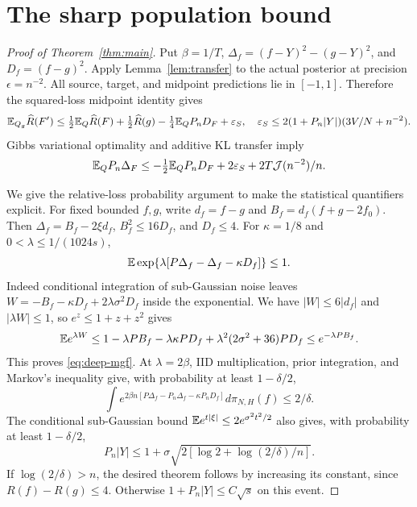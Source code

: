 \section{The sharp population bound}
\begin{proof}[Proof of Theorem~\ref{thm:main}]
Put $\beta=1/T$, $\Delta_f=(f-Y)^2-(g-Y)^2$, and
$D_f=(f-g)^2$. Apply Lemma~\ref{lem:transfer} to the actual posterior at precision $\epsilon=n^{-2}$. All source, target, and midpoint predictions lie in $[-1,1]$. Therefore the squared-loss midpoint identity gives
\[
 \mathbb E_{Q_g}\widehat R(F')\le\tfrac12\mathbb E_Q\widehat R(F)
 +\tfrac12\widehat R(g)-\tfrac14\mathbb E_Q P_nD_F+\varepsilon_S,
 \quad
 \varepsilon_S\le2(1+P_n|Y|)(3V/N+n^{-2}).
\]
Gibbs variational optimality and additive KL transfer imply
\begin{equation}
 \mathbb E_QP_n\Delta_F\le-\tfrac12\mathbb E_QP_nD_F
        +2\varepsilon_S+2T\mathcal J(n^{-2})/n.
 \label{eq:deep-offset}
\end{equation}

We give the relative-loss probability argument to make the statistical quantifiers explicit. For fixed bounded $f,g$, write $d_f=f-g$ and
$B_f=d_f(f+g-2f_0)$. Then $\Delta_f=B_f-2\xi d_f$,
$B_f^2\le16D_f$, and $D_f\le4$. For $\kappa=1/8$ and $0<\lambda\le1/(1024s)$,
\begin{equation}
 \mathbb E\exp\{\lambda[P\Delta_f-\Delta_f-\kappa D_f]\}\le1.
 \label{eq:deep-mgf}
\end{equation}
Indeed conditional integration of sub-Gaussian noise leaves
$W=-B_f-\kappa D_f+2\lambda\sigma^2D_f$ inside the exponential. We have $|W|\le6|d_f|$ and $|\lambda W|\le1$, so $e^z\le1+z+z^2$ gives
\[
 \mathbb E e^{\lambda W}\le1-\lambda PB_f-\lambda\kappa PD_f
          +\lambda^2(2\sigma^2+36)PD_f\le e^{-\lambda PB_f}.
\]
This proves \eqref{eq:deep-mgf}. At $\lambda=2\beta$, IID multiplication, prior integration, and Markov's inequality give, with probability at least $1-\delta/2$,
\[
 \int e^{2\beta n[P\Delta_f-P_n\Delta_f-\kappa P_nD_f]}
                d\pi_{N,H}(f)\le2/\delta.
\]
The conditional sub-Gaussian bound $\mathbb E e^{t|\xi|}\le2e^{\sigma^2t^2/2}$ also gives, with probability at least $1-\delta/2$,
\[
 P_n|Y|\le1+\sigma\sqrt{2[\log2+\log(2/\delta)/n]}.
\]
If $\log(2/\delta)>n$, the desired theorem follows by increasing its constant, since $R(f)-R(g)\le4$. Otherwise $1+P_n|Y|\le C\sqrt s$ on this event.


\end{proof}
